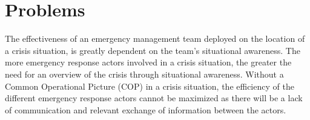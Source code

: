 \chapter{Problems}
The effectiveness of an emergency management team deployed on the location of a crisis situation, is greatly dependent on the team's situational awareness. The more emergency response actors involved in a crisis situation, the greater the need for an overview of the crisis through situational awareness. Without a Common Operational Picture (COP) in a crisis situation, the efficiency of the different emergency response actors cannot be maximized as there will be a lack of communication and relevant exchange of information between the actors.
